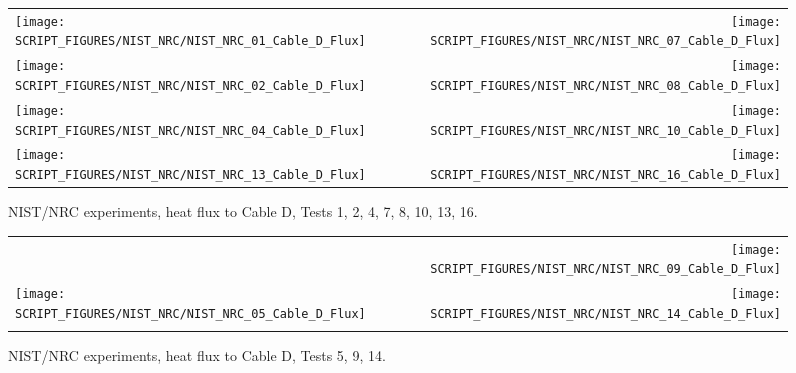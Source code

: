 \begin{figure}[p]
\begin{tabular*}{\textwidth}{l@{\extracolsep{\fill}}r}
\texttt{[image: SCRIPT\_FIGURES/NIST\_NRC/NIST\_NRC\_01\_Cable\_D\_Flux]} &
\texttt{[image: SCRIPT\_FIGURES/NIST\_NRC/NIST\_NRC\_07\_Cable\_D\_Flux]} \\
\texttt{[image: SCRIPT\_FIGURES/NIST\_NRC/NIST\_NRC\_02\_Cable\_D\_Flux]} &
\texttt{[image: SCRIPT\_FIGURES/NIST\_NRC/NIST\_NRC\_08\_Cable\_D\_Flux]} \\
\texttt{[image: SCRIPT\_FIGURES/NIST\_NRC/NIST\_NRC\_04\_Cable\_D\_Flux]} &
\texttt{[image: SCRIPT\_FIGURES/NIST\_NRC/NIST\_NRC\_10\_Cable\_D\_Flux]} \\
\texttt{[image: SCRIPT\_FIGURES/NIST\_NRC/NIST\_NRC\_13\_Cable\_D\_Flux]} &
\texttt{[image: SCRIPT\_FIGURES/NIST\_NRC/NIST\_NRC\_16\_Cable\_D\_Flux]}
\end{tabular*}
\caption[NIST/NRC experiments, heat flux to Cable D, Tests 1, 2, 4, 7, 8, 10, 13, 16]
{NIST/NRC experiments, heat flux to Cable D, Tests 1, 2, 4, 7, 8, 10, 13, 16.}
\label{NIST_NRC_Cable_D_Flux_Closed}
\end{figure}

\begin{figure}[p]
\begin{tabular*}{\textwidth}{l@{\extracolsep{\fill}}r}
                           &
\texttt{[image: SCRIPT\_FIGURES/NIST\_NRC/NIST\_NRC\_09\_Cable\_D\_Flux]} \\
\texttt{[image: SCRIPT\_FIGURES/NIST\_NRC/NIST\_NRC\_05\_Cable\_D\_Flux]} &
\texttt{[image: SCRIPT\_FIGURES/NIST\_NRC/NIST\_NRC\_14\_Cable\_D\_Flux]} \\
                      &
\end{tabular*}
\caption[NIST/NRC experiments, heat flux to Cable D, Tests 5, 9, 14]
{NIST/NRC experiments, heat flux to Cable D, Tests 5, 9, 14.}
\label{NIST_NRC_Cable_D_Flux_Open}
\end{figure}

